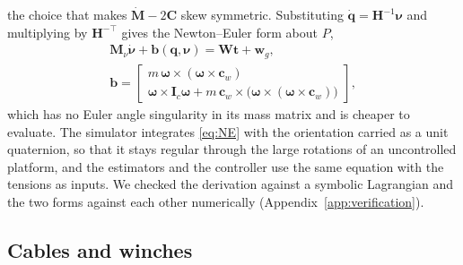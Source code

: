 \documentclass{interact}
\newcommand{\vc}[1]{\bm{#1}}
\newcommand{\mt}[1]{\mathbf{#1}}
\begin{document}
the choice that makes $\dot{\mt M}-2\mt C$ skew symmetric. Substituting $\dot{\vc q}=\mt H^{-1}\vc\nu$ and multiplying by $\mt H^{-\top}$ gives the Newton--Euler form about $P$,
\begin{equation}\label{eq:NE}
\begin{gathered}
\mt M_\nu\dot{\vc\nu}+\vc b(\vc q,\vc\nu)=\mt W\vc t+\vc w_g,\\
\vc b=\begin{bmatrix}m\,\vc\omega\times(\vc\omega\times\vc c_w)\\ \vc\omega\times\mt I_c\vc\omega+m\,\vc c_w\times\big(\vc\omega\times(\vc\omega\times\vc c_w)\big)\end{bmatrix},
\end{gathered}
\end{equation}
which has no Euler angle singularity in its mass matrix and is cheaper to evaluate. The simulator integrates \eqref{eq:NE} with the orientation carried as a unit quaternion, so that it stays regular through the large rotations of an uncontrolled platform, and the estimators and the controller use the same equation with the tensions as inputs. We checked the derivation against a symbolic Lagrangian and the two forms against each other numerically (Appendix~\ref{app:verification}).

\subsection{Cables and winches}\label{sec:cables}
\end{document}

